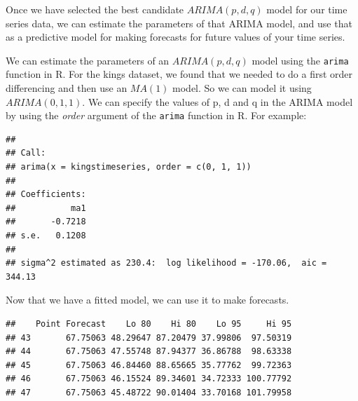 \documentclass[11pt, letterpaper, twoside]{memoir}\usepackage{knitr}
\begin{document}
Once we have selected the best candidate $ARIMA(p,d,q)$ model for our time series data, we can estimate the parameters of that ARIMA model, and use that as a predictive model for making forecasts for future values of your time series.

We can estimate the parameters of an $ARIMA(p,d,q)$ model using the \texttt{arima} function in R. For the kings dataset, we found that we needed to do a first order differencing and then use an $MA(1)$ model. So we can model it using $ARIMA(0,1,1)$. We can specify the values of p, d and q in the ARIMA model by using the \emph{order} argument of the \texttt{arima} function in R. For example:

\begin{knitrout}
\color{fgcolor}\begin{kframe}
\begin{alltt}
 \hlkwb{<-}  \hlstd{=}\hlstd{(}\hlstd{,}\hlstd{,}\hlstd{))}
\end{alltt}
\begin{verbatim}
## 
## Call:
## arima(x = kingstimeseries, order = c(0, 1, 1))
## 
## Coefficients:
##           ma1
##       -0.7218
## s.e.   0.1208
## 
## sigma^2 estimated as 230.4:  log likelihood = -170.06,  aic = 344.13
\end{verbatim}
\end{kframe}
\end{knitrout}

Now that we have a fitted model, we can use it to make forecasts.

\begin{knitrout}
\color{fgcolor}\begin{kframe}
\begin{alltt}
 \hlkwb{<-}  \hlstd{=}\hlstd{)}
\end{alltt}
\begin{verbatim}
##    Point Forecast    Lo 80    Hi 80    Lo 95     Hi 95
## 43       67.75063 48.29647 87.20479 37.99806  97.50319
## 44       67.75063 47.55748 87.94377 36.86788  98.63338
## 45       67.75063 46.84460 88.65665 35.77762  99.72363
## 46       67.75063 46.15524 89.34601 34.72333 100.77792
## 47       67.75063 45.48722 90.01404 33.70168 101.79958
\end{verbatim}
\end{kframe}
\end{knitrout}
\end{document}
